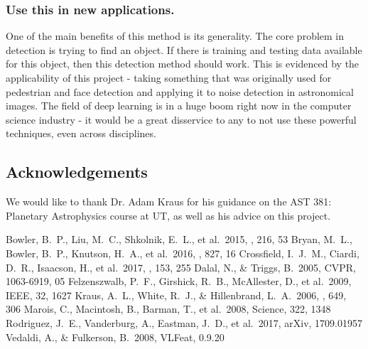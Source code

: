 \documentclass[twocolumn,longauthor]{aastex61}
\begin{document}
\subsubsection{Use this in new applications.} \label{subsubsec:applications}
\noindent One of the main benefits of this method is its generality. The core problem in detection is trying to find an object. If there is training and testing data available for this object, then this detection method should work. This is evidenced by the applicability of this project - taking something that was originally used for pedestrian and face detection and applying it to noise detection in astronomical images. The field of deep learning is in a huge boom right now in the computer science industry - it would be a great disservice to any to not use these powerful techniques, even across disciplines.


\subsection{Acknowledgements} \label{subsec:acknowledgements}
\noindent We would like to thank Dr. Adam Kraus for his guidance on the AST 381: Planetary Astrophysics course at UT, as well as his advice on this project.



\begin{thebibliography}{}
 Bowler, B.~P., Liu, M.~C., Shkolnik, E.~L., et al.\ 2015, \apjs, 216, 53
 Bryan, M.~L., Bowler, B.~P., Knutson, H.~A., et al.\ 2016, \apj, 827, 16
 Crossfield, I.~J.~M., Ciardi, D.~R., Isaacson, H., et al.\ 2017, \apj, 153, 255
 Dalal, N., \& Triggs, B.\ 2005, CVPR, 1063-6919, 05
 Felzenszwalb, P.~F., Girshick, R.~B., McAllester, D., et al.\ 2009, IEEE, 32, 1627
 Kraus, A.~L., White, R.~J., \& Hillenbrand, L.~A.\ 2006, \apj, 649, 306
 Marois, C., Macintosh, B., Barman, T., et al.\ 2008, Science, 322, 1348
 Rodriguez, J.~E., Vanderburg, A., Eastman, J.~D., et al.\ 2017, arXiv, 1709.01957
 Vedaldi, A., \& Fulkerson, B.\ 2008, VLFeat, 0.9.20
\end{thebibliography}
\end{document}
